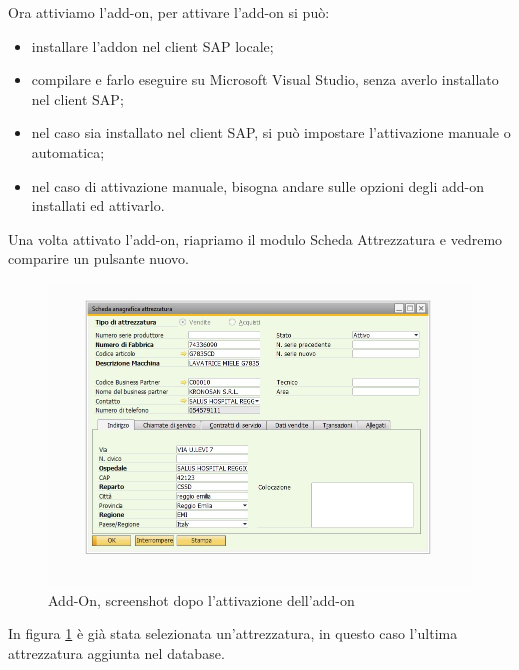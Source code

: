 \newpage

\begin{flushleft}
	Ora attiviamo l'add-on, per attivare l'add-on si può:
\end{flushleft}
\begin{itemize}
	\item installare l'addon nel client SAP locale;
	\item compilare e farlo eseguire su Microsoft Visual Studio, senza averlo installato nel client SAP;
	\item nel caso sia installato nel client SAP, si può impostare l'attivazione manuale o automatica;
	\item nel caso di attivazione manuale, bisogna andare sulle opzioni degli add-on installati ed attivarlo.
\end{itemize} 
\begin{flushleft}
	
	Una volta attivato l'add-on, riapriamo il modulo Scheda Attrezzatura e vedremo comparire un pulsante nuovo.
	
\end{flushleft}
\begin{figure}[!h] 
	\centering 
	\includegraphics[scale = 0.6]{immagini/add-on/addon-scheda-yesbutton.jpg} 
	\caption{Add-On, screenshot dopo l'attivazione dell'add-on}
	\label{fig:4-5}
\end{figure}
\begin{flushleft}
	
	In figura \ref{fig:4-5} è già stata selezionata un'attrezzatura, in questo caso l'ultima attrezzatura aggiunta nel database.
	
\end{flushleft}

